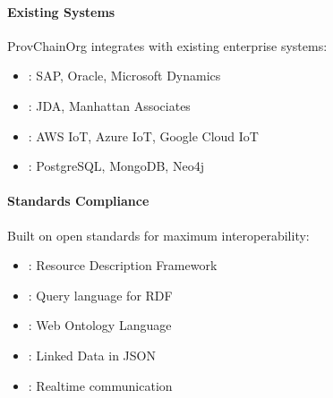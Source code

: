 \documentclass[letterpaper,10pt,english]{sphinxmanual}
\begin{document}
\paragraph{Existing Systems}
\label{\detokenize{stack/intro-to-stack:existing-systems}}
\sphinxAtStartPar
ProvChainOrg integrates with existing enterprise systems:
\begin{itemize}
\item {} 
\sphinxAtStartPar
{}: SAP, Oracle, Microsoft Dynamics

\item {} 
\sphinxAtStartPar
{}: JDA, Manhattan Associates

\item {} 
\sphinxAtStartPar
{}: AWS IoT, Azure IoT, Google Cloud IoT

\item {} 
\sphinxAtStartPar
{}: PostgreSQL, MongoDB, Neo4j

\end{itemize}


\paragraph{Standards Compliance}
\label{\detokenize{stack/intro-to-stack:standards-compliance}}
\sphinxAtStartPar
Built on open standards for maximum interoperability:
\begin{itemize}
\item {} 
\sphinxAtStartPar
{}: Resource Description Framework

\item {} 
\sphinxAtStartPar
{}: Query language for RDF

\item {} 
\sphinxAtStartPar
{}: Web Ontology Language

\item {} 
\sphinxAtStartPar
{}: Linked Data in JSON

\item {} 
\sphinxAtStartPar
{}: Real\sphinxhyphen{}time communication

\end{itemize}
\end{document}
